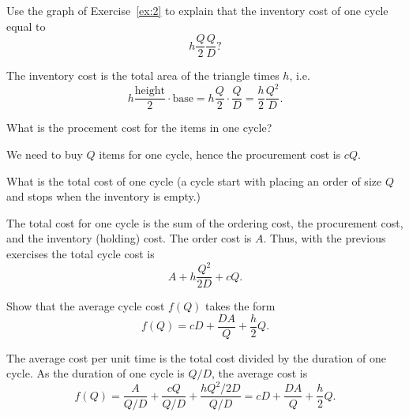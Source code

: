\begin{exercise}
Use the graph of Exercise~\ref{ex:2} to explain that the inventory cost of one cycle equal to 
  \begin{equation*}
    h \frac Q  2\frac  Q D?
  \end{equation*}
  \begin{solution}
 The inventory cost is the total area of the triangle times $h$, i.e. 
\begin{equation*}
  h \frac{\text{height}} 2 \cdot\text{base} = h \frac Q 2 \cdot \frac Q D= \frac h 2 \frac{Q^2}D.
\end{equation*}
  \end{solution}
\end{exercise}

\begin{exercise}
  What is the procement cost for the items in one cycle?
  \begin{solution}
We need to buy $Q$ items for one cycle, hence the procurement cost is $c Q$.
  \end{solution}
\end{exercise}

\begin{exercise}
What is the total cost of one cycle (a cycle start with placing an order of size $Q$ and stops when the inventory is empty.)
  \begin{solution}
The total cost for one cycle is the sum of the ordering cost, the procurement cost, and the inventory (holding) cost. The order cost is $A$. Thus, with the previous exercises
 the total cycle cost is 
\begin{equation*}
A+h\frac{Q^2}{2 D} + c Q.
\end{equation*}
\end{solution}
\end{exercise}

\begin{exercise}
Show that the average cycle cost $f(Q)$ takes the form
\begin{equation*}
f(Q) =  cD + \frac{D A} Q + \frac h 2 Q.
\end{equation*}
  \begin{solution}
The average cost per unit time is the total cost divided by the duration of one cycle. As the duration of one cycle is $Q/D$, the average cost is
\begin{equation*}
f(Q) = \frac A{Q/D}+  \frac{cQ}{Q/D} + \frac{ h Q^2/2D}{Q/D} = cD + \frac{D A} Q + \frac h 2 Q.
\end{equation*}
  \end{solution}
\end{exercise}

